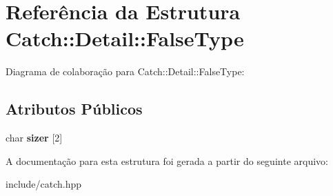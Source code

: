 \hypertarget{structCatch_1_1Detail_1_1FalseType}{}\section{Referência da Estrutura Catch\+:\+:Detail\+:\+:False\+Type}
\label{structCatch_1_1Detail_1_1FalseType}


Diagrama de colaboração para Catch\+:\+:Detail\+:\+:False\+Type\+:
\subsection*{Atributos Públicos}
\begin{DoxyCompactItemize}
\item 
char {\bfseries sizer} \mbox{[}2\mbox{]}\hypertarget{structCatch_1_1Detail_1_1FalseType_abc1a730e197d6f7750ae8aaf47b63477}{}\label{structCatch_1_1Detail_1_1FalseType_abc1a730e197d6f7750ae8aaf47b63477}

\end{DoxyCompactItemize}


A documentação para esta estrutura foi gerada a partir do seguinte arquivo\+:\begin{DoxyCompactItemize}
\item 
include/catch.\+hpp\end{DoxyCompactItemize}

